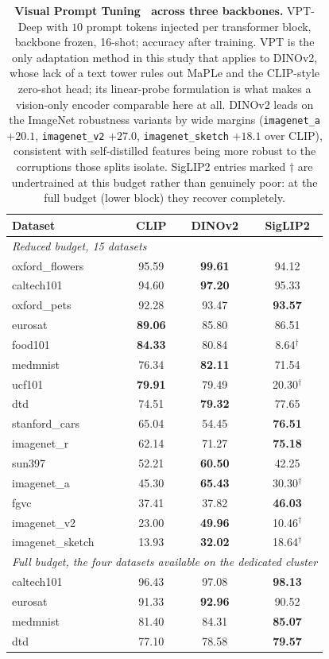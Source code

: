 \begin{table}[htbp]
\centering
\small
\caption{\textbf{Visual Prompt Tuning~\citep{jia2022visual} across three backbones.}
VPT-Deep with $10$ prompt tokens injected per transformer block, backbone frozen,
16-shot; accuracy after training. VPT is the only adaptation method in this study that
applies to DINOv2, whose lack of a text tower rules out MaPLe and the CLIP-style
zero-shot head; its linear-probe formulation is what makes a vision-only encoder
comparable here at all. DINOv2 leads on the ImageNet robustness variants by wide
margins (\texttt{imagenet\_a} $+20.1$, \texttt{imagenet\_v2} $+27.0$,
\texttt{imagenet\_sketch} $+18.1$ over CLIP), consistent with self-distilled features
being more robust to the corruptions those splits isolate. SigLIP2 entries marked
$\dagger$ are undertrained at this budget rather than genuinely poor: at the full budget
(lower block) they recover completely.}
\label{tab:expanded_vpt}
\setlength{\tabcolsep}{8pt}
\begin{tabular}{lccc}
\toprule
\textbf{Dataset} & \textbf{CLIP} & \textbf{DINOv2} & \textbf{SigLIP2} \\
\midrule
\multicolumn{4}{l}{\emph{Reduced budget, 15 datasets}} \\
oxford\_flowers  & 95.59 & \bf 99.61 & 94.12 \\
caltech101       & 94.60 & \bf 97.20 & 95.33 \\
oxford\_pets     & 92.28 & 93.47 & \bf 93.57 \\
eurosat          & \bf 89.06 & 85.80 & 86.51 \\
food101          & \bf 84.33 & 80.84 & \phantom{0}8.64$^{\dagger}$ \\
medmnist         & 76.34 & \bf 82.11 & 71.54 \\
ucf101           & \bf 79.91 & 79.49 & 20.30$^{\dagger}$ \\
dtd              & 74.51 & \bf 79.32 & 77.65 \\
stanford\_cars   & 65.04 & 54.45 & \bf 76.51 \\
imagenet\_r      & 62.14 & 71.27 & \bf 75.18 \\
sun397           & 52.21 & \bf 60.50 & 42.25 \\
imagenet\_a      & 45.30 & \bf 65.43 & 30.30$^{\dagger}$ \\
fgvc             & 37.41 & 37.82 & \bf 46.03 \\
imagenet\_v2     & 23.00 & \bf 49.96 & 10.46$^{\dagger}$ \\
imagenet\_sketch & 13.93 & \bf 32.02 & 18.64$^{\dagger}$ \\
\midrule
\multicolumn{4}{l}{\emph{Full budget, the four datasets available on the dedicated cluster}} \\
caltech101 & 96.43 & 97.08 & \bf 98.13 \\
eurosat    & 91.33 & \bf 92.96 & 90.52 \\
medmnist   & 81.40 & 84.31 & \bf 85.07 \\
dtd        & 77.10 & 78.58 & \bf 79.57 \\
\bottomrule
\end{tabular}
\end{table}

